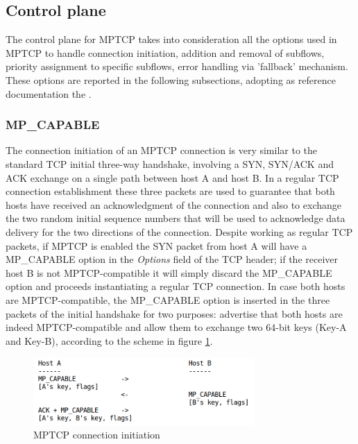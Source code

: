 \subsection{Control plane}
The control plane for MPTCP takes into consideration all the options used in MPTCP to handle connection initiation, addition and removal of subflows, priority assignment to specific subflows, error handling via 'fallback' mechanism. These options are reported in the following subsections, adopting as reference documentation the .

\subsubsection{MP\_CAPABLE}
The connection initiation of an MPTCP connection is very similar to the standard TCP initial three-way handshake, involving a SYN, SYN/ACK and ACK exchange on a single path between host A and host B. In a regular TCP connection establishment these three packets are used to guarantee that both hosts have received an acknowledgment of the connection and also to exchange the two random initial sequence numbers that will be used to acknowledge data delivery for the two directions of the connection. Despite working as regular TCP packets, if MPTCP is enabled the SYN packet from host A will have a MP\_CAPABLE option in the \textit{Options} field of the TCP header; if the receiver host B is not MPTCP-compatible it will simply discard the MP\_CAPABLE option and proceeds instantiating a regular TCP connection.
In case both hosts are MPTCP-compatible, the MP\_CAPABLE option is inserted in the three packets of the initial handshake for two purposes: advertise that both hosts are indeed MPTCP-compatible and allow them to exchange two 64-bit keys (Key-A and Key-B), according to the scheme in figure \ref{fig:mpcapable}.

\begin{figure}[!htb]
\centering
\includegraphics[width=0.75\textwidth]{images/mpcapable}
\caption{MPTCP connection initiation}
\label{fig:mpcapable}
\end{figure}

